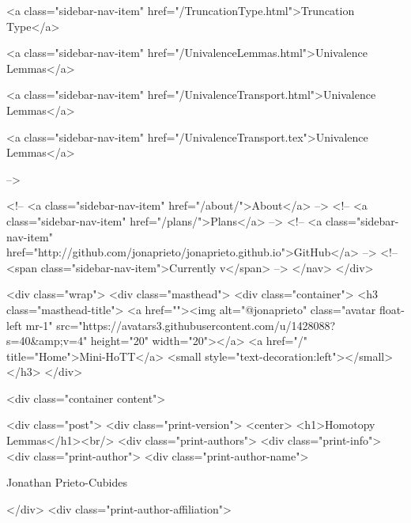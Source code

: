       
    
      
        
          <a class="sidebar-nav-item" href="/TruncationType.html">Truncation Type</a>
        
      
    
      
        
          <a class="sidebar-nav-item" href="/UnivalenceLemmas.html">Univalence Lemmas</a>
        
      
    
      
        
          <a class="sidebar-nav-item" href="/UnivalenceTransport.html">Univalence Lemmas</a>
        
      
    
      
        
          <a class="sidebar-nav-item" href="/UnivalenceTransport.tex">Univalence Lemmas</a>
        
      
     -->

    <!-- <a class="sidebar-nav-item" href="/about/">About</a> -->
    <!-- <a class="sidebar-nav-item" href="/plans/">Plans</a> -->
    <!-- <a class="sidebar-nav-item" href="http://github.com/jonaprieto/jonaprieto.github.io">GitHub</a> -->
    <!-- <span class="sidebar-nav-item">Currently v</span> -->
  </nav>
</div>

    <div class="wrap">
      <div class="masthead">
        <div class="container">
          <h3 class="masthead-title">
            <a href=""><img alt="@jonaprieto" class="avatar float-left mr-1" src="https://avatars3.githubusercontent.com/u/1428088?s=40&amp;v=4" height="20" width="20"></a>
            <a href="/" title="Home">Mini-HoTT</a>
            <small style="text-decoration:left"></small>
          </h3>
        </div>
      
      <div class="container content">
        







<div class="post">
  <div class="print-version">
    <center>
      <h1>Homotopy Lemmas</h1><br/>
        <div class="print-authors">
          <div class="print-info">
            <div class="print-author">
              <div class="print-author-name">
                
                  Jonathan Prieto-Cubides
                
              </div>
              <div class="print-author-affiliation">
                
